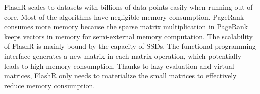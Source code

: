 \documentclass[simplex.tex]{subfiles}
\begin{document}
FlashR scales to datasets with billions of data points easily when running
out of core. Most of the algorithms have negligible memory consumption.
PageRank consumes more memory because the sparse matrix multiplication in
PageRank keeps vectors in memory for semi-external memory computation.
The scalability of FlashR is mainly bound by the capacity of SSDs.
The functional programming
interface generates a new matrix in each matrix operation, which potentially
leads to high memory consumption. Thanks to lazy evaluation and virtual matrices,
FlashR only needs to materialize the small matrices to effectively reduce
memory consumption.

\end{document}
